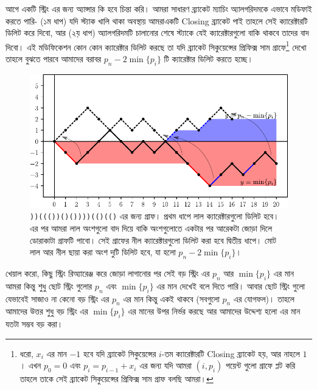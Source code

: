 \begin{solution}
আগে একটি স্ট্রিং এর জন্য অ্যান্সার কি হবে চিন্তা করি। আমরা সাধারণ ব্র্যাকেট ম্যাচিং অ্যালগরিদমকে এভাবে মডিফাই করতে পারি- (১ম ধাপ) যদি স্ট্যাক খালি থাকা অবস্থায় আমরাএকটি Closing ব্র্যাকেট পাই তাহলে সেই ক্যারেক্টারটি ডিলিট করে দিবো, আর (২য় ধাপ) অ্যালগরিদমটি চালানোর শেষে স্ট্যাকে যেই ক্যারেক্টারগুলো বাকি থাকবে তাদের বাদ দিবো। এই মডিফিকেশন কোন কোন ক্যারেক্টার ডিলিট করছে তা যদি ব্র্যাকেট সিকুয়েন্সের প্রিফিক্স সাম গ্রাফে\footnote{ধরো, $x_i$ এর মান $-1$ হবে যদি ব্র্যাকেট সিকুয়েন্সের $i$-তম ক্যারেক্টারটি Closing ব্র্যাকেট হয়, আর নাহলে $1$। এখন $p_0 = 0$ এবং $p_i = p_{i-1} + x_i$ এর জন্য যদি আমরা $(i, p_i)$ পয়েন্ট গুলো গ্রাফে প্লট করি তাহলে তাকে সেই ব্র্যাকেট সিকুয়েন্সের প্রিফিক্স সাম গ্রাফ বলছি আমরা।} দেখো তাহলে বুঝতে পারবে আমাদের বরাবর $p_n - 2\min\{p_i\}$ টি ক্যারেক্টার ডিলিট করতে হচ্ছে।
\begin{figure}[H]
  \centering
  \includegraphics[width = \linewidth]{./img/exchange-arg/bracket-sequence.pdf}
  \caption{\texttt{))((())()())))(()(()} এর জন্য গ্রাফ। প্রথম ধাপে লাল ক্যারেক্টারগুলো ডিলিট হবে। এর পর আমরা লাল অংশগুলো বাদ দিয়ে বাকি অংশগুলোতে একটার পর আরেকটা জোড়া দিলে ডোরাকাটা গ্রাফটি পাবো। সেই গ্রাফের নীল ক্যারেক্টারগুলো ডিলিট করা হবে দ্বিতীয় ধাপে। মোট লাল আর নীল ছায়া করা অংশ দুটি  ডিলিট হবে, যা হলো $p_n - 2\min\{p_i\}$।}
\end{figure}
খেয়াল করো, কিছু স্ট্রিং রিঅ্যারেঞ্জ করে জোড়া লাগানোর পর সেই বড় স্ট্রিং এর $p_n$ আর $\min\{p_i\}$ এর মান আমরা কিন্তু শুধু ছোট স্ট্রিং গুলোর $p_n$ এবং $\min\{p_i\}$ এর মান দেখেই বলে দিতে পারি। আবার ছোট স্ট্রিং গুলো যেভাবেই সাজাও না কেনো বড় স্ট্রিং এর $p_n$ এর মান কিন্তু একই থাকবে (সবগুলো $p_n$ এর যোগফল)। তাহলে আমাদের উত্তর শুধু বড় স্ট্রিং এর $\min\{p_i\}$ এর মানের উপর নির্ভর করছে আর আমাদের উদ্দেশ্য হলো এর মান যতটা সম্ভব বড় করা।


\end{solution}

